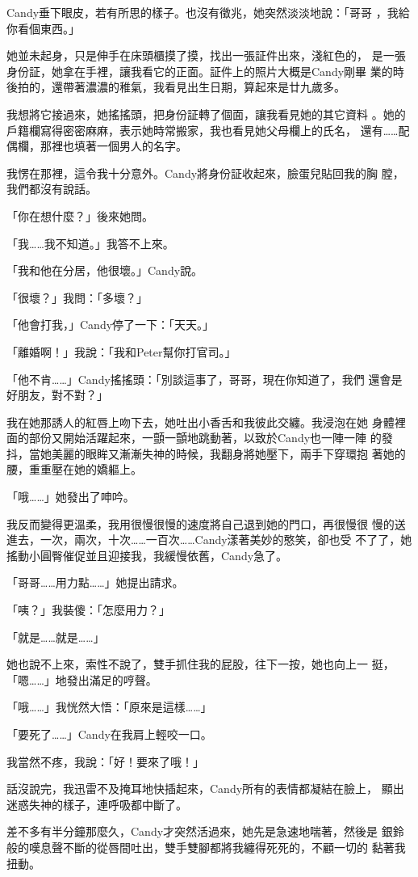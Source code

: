 Candy垂下眼皮，若有所思的樣子。也沒有徵兆，她突然淡淡地說：「哥哥
，我給你看個東西。」

她並未起身，只是伸手在床頭櫃摸了摸，找出一張証件出來，淺紅色的，
是一張身份証，她拿在手裡，讓我看它的正面。証件上的照片大概是Candy剛畢
業的時後拍的，還帶著濃濃的稚氣，我看見出生日期，算起來是廿九歲多。

我想將它接過來，她搖搖頭，把身份証轉了個面，讓我看見她的其它資料
。她的戶籍欄寫得密密麻麻，表示她時常搬家，我也看見她父母欄上的氏名，
還有……配偶欄，那裡也填著一個男人的名字。

我愣在那裡，這令我十分意外。Candy將身份証收起來，臉蛋兒貼回我的胸
膛，我們都沒有說話。

「你在想什麼？」後來她問。

「我……我不知道。」我答不上來。

「我和他在分居，他很壞。」Candy說。

「很壞？」我問：「多壞？」

「他會打我，」Candy停了一下：「天天。」

「離婚啊！」我說：「我和Peter幫你打官司。」

「他不肯……」Candy搖搖頭：「別談這事了，哥哥，現在你知道了，我們
還會是好朋友，對不對？」

我在她那誘人的紅唇上吻下去，她吐出小香舌和我彼此交纏。我浸泡在她
身體裡面的部份又開始活躍起來，一顫一顫地跳動著，以致於Candy也一陣一陣
的發抖，當她美麗的眼眸又漸漸失神的時候，我翻身將她壓下，兩手下穿環抱
著她的腰，重重壓在她的嬌軀上。

「哦……」她發出了呻吟。

我反而變得更溫柔，我用很慢很慢的速度將自己退到她的門口，再很慢很
慢的送進去，一次，兩次，十次……一百次……Candy漾著美妙的憨笑，卻也受
不了了，她搖動小圓臀催促並且迎接我，我緩慢依舊，Candy急了。

「哥哥……用力點……」她提出請求。

「咦？」我裝傻：「怎麼用力？」

「就是……就是……」

她也說不上來，索性不說了，雙手抓住我的屁股，往下一按，她也向上一
挺，「嗯……」地發出滿足的哼聲。

「哦……」我恍然大悟：「原來是這樣……」

「要死了……」Candy在我肩上輕咬一口。

我當然不疼，我說：「好！要來了哦！」

話沒說完，我迅雷不及掩耳地快插起來，Candy所有的表情都凝結在臉上，
顯出迷惑失神的樣子，連呼吸都中斷了。

差不多有半分鐘那麼久，Candy才突然活過來，她先是急速地喘著，然後是
銀鈴般的嘆息聲不斷的從唇間吐出，雙手雙腳都將我纏得死死的，不顧一切的
黏著我扭動。

